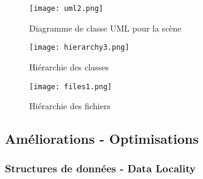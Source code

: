 \documentclass[a4paper,french,12pt]{article}
\begin{document}
	    \begin{figure}
			      \centering
			      \texttt{[image: uml2.png]}
			      \caption{Diagramme de classe UML pour la scène}
	    \end{figure}

	    \begin{figure}
			      \centering
			      \texttt{[image: hierarchy3.png]}
			      \caption{Hiérarchie des classes}
	    \end{figure}



	    \begin{figure}
	      \centering
	      \texttt{[image: files1.png]}
	      \caption{Hiérarchie des fichiers}
	    \end{figure}
	    \FloatBarrier

  \subsection{Améliorations - Optimisations}

    \subsubsection{Structures de données - Data Locality}
\end{document}
